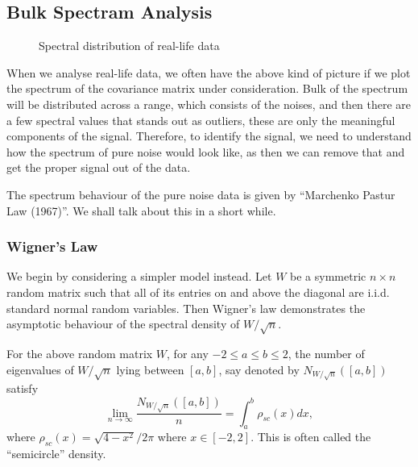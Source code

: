 \documentclass[12pt]{article}
\begin{document}
\subsection{Bulk Spectram Analysis}

\begin{figure}[h]
    \centering
    \caption{Spectral distribution of real-life data}
\end{figure}

When we analyse real-life data, we often have the above kind of picture if we plot the spectrum of the covariance matrix under consideration. Bulk of the spectrum will be distributed across a range, which consists of the noises, and then there are a few spectral values that stands out as outliers, these are only the meaningful components of the signal. Therefore, to identify the signal, we need to understand how the spectrum of pure noise would look like, as then we can remove that and get the proper signal out of the data.

The spectrum behaviour of the pure noise data is given by ``Marchenko Pastur Law (1967)''. We shall talk about this in a short while.

\subsubsection{Wigner's Law}

We begin by considering a simpler model instead. Let $W$ be a symmetric $n \times n$ random matrix such that all of its entries on and above the diagonal are i.i.d. standard normal random variables. Then Wigner's law demonstrates the asymptotic behaviour of the spectral density of $W/\sqrt{n}$. 

\begin{theorembox}
    For the above random matrix $W$, for any $-2 \leq a \leq b \leq 2$, the number of eigenvalues of $W/\sqrt{n}$ lying between $[a, b]$, say denoted by $N_{W/\sqrt{n}}([a, b])$ satisfy
    \begin{equation*}
        \lim_{n\rightarrow \infty} \dfrac{N_{W/\sqrt{n}}([a, b])}{n} = \int_a^b \rho_{sc}(x) dx,
    \end{equation*}
    \noindent where $\rho_{sc}(x) = \sqrt{4-x^2}/2\pi$ where $x \in [-2, 2]$. This is often called the ``semicircle'' density.
\end{theorembox}
\end{document}
